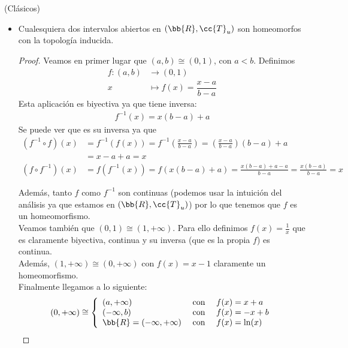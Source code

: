\begin{ejemplo}(Clásicos)
    \begin{itemize}
        \item Cualesquiera dos intervalos abiertos en $(\bb{R}, \cc{T}_u)$ son homeomorfos con la topología inducida.
        \begin{proof}
            Veamos en primer lugar que $(a,b) \cong (0,1)$, con $a<b$. Definimos
            \begin{align*}
                f:(a,b) & \to (0,1)\\
                x&\mapsto f(x)=\dfrac{x-a}{b-a}
            \end{align*}
            Esta aplicación es biyectiva ya que tiene inversa:
            \begin{align*}
                f^{-1}(x)=x(b-a)+a
            \end{align*}
            Se puede ver que es su inversa ya que 
            \begin{align*}
                (f^{-1}\circ f)(x)&=f^{-1}(f(x))=f^{-1}\left(\frac{x-a}{b-a}\right) =
                \left(\frac{x-a}{b-a}\right)(b-a)+a \\&= x - a + a = x\\
                (f\circ f^{-1})(x)&=f(f^{-1}(x))=f(x(b-a)+a)=\frac{x(b-a)+a - a}{b-a} = \frac{x(b-a)}{b-a}=x
            \end{align*}

            Además, tanto $f$ como $f^{-1}$ son continuas (podemos usar la intuición del análisis ya que estamos en $(\bb{R}, \cc{T}_u)$) por lo que tenemos que $f$ es un homeomorfismo.\\

            Veamos también que $(0,1)\cong (1, +\infty)$. Para ello definimos $f(x)=\frac{1}{x}$ que es claramente biyectiva, continua y su inversa (que es la propia $f$) es continua.\\

            Además, $(1, +\infty)\cong (0,+\infty)$ con $f(x)=x-1$ claramente un homeomorfismo.\\

            Finalmente llegamos a lo siguiente:
            \begin{gather*}
                (0,+\infty)\cong \left\{
                \begin{array}{lcl}
                    (a, +\infty) & \text{ con } & f(x)=x+a\\
                    (-\infty, b) & \text{ con } & f(x) = -x +b\\
                    \bb{R}=(-\infty, +\infty) & \text{ con } & f(x)=\ln(x)\\
                \end{array}
                \right.
            \end{gather*}
        \end{proof}


\end{itemize}
\end{ejemplo}
